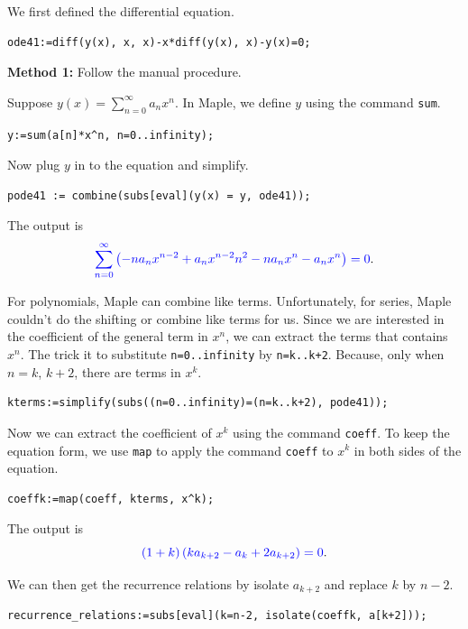 \documentclass[
  12pt]{elegantbook}
\begin{document}
\begin{solution}
We first defined the differential equation.

\begin{verbatim}
ode41:=diff(y(x), x, x)-x*diff(y(x), x)-y(x)=0;
\end{verbatim}

\textbf{Method 1:} Follow the manual procedure.

Suppose \(y(x)=\sum\limits_{n=0}^\infty a_nx^n\). In Maple, we define \(y\) using the command \texttt{sum}.

\begin{verbatim}
y:=sum(a[n]*x^n, n=0..infinity);
\end{verbatim}

Now plug \(y\) in to the equation and simplify.

\begin{verbatim}
pode41 := combine(subs[eval](y(x) = y, ode41));
\end{verbatim}

The output is
\[{\color{blue}\sum\limits_{n=0}^\infty\left(-n a_{n} x^{n -2}+a_{n} x^{n -2} n^{2}-n a_{n} x^{n}-a_{n} x^{n}\right) = 0}.\]

For polynomials, Maple can combine like terms. Unfortunately, for series, Maple couldn't do the shifting or combine like terms for us. Since we are interested in the coefficient of the general term in \(x^n\), we can extract the terms that contains \(x^n\). The trick it to substitute \texttt{n=0..infinity} by \texttt{n=k..k+2}. Because, only when \(n=k\), \(k+2\), there are terms in \(x^k\).

\begin{verbatim}
kterms:=simplify(subs((n=0..infinity)=(n=k..k+2), pode41));
\end{verbatim}

Now we can extract the coefficient of \(x^k\) using the command \texttt{coeff}. To keep the equation form, we use \texttt{map} to apply the command \texttt{coeff} to \(x^k\) in both sides of the equation.

\begin{verbatim}
coeffk:=map(coeff, kterms, x^k);
\end{verbatim}

The output is
\[{\color{blue}\left(1+k \right) \left(k a_{k +2}-a_{k}+2 a_{k +2}\right) = 0}.\]

We can then get the recurrence relations by isolate \(a_{k+2}\) and replace \(k\) by \(n-2\).

\begin{verbatim}
recurrence_relations:=subs[eval](k=n-2, isolate(coeffk, a[k+2]));
\end{verbatim}


\end{solution}
\end{document}
